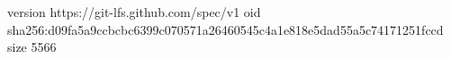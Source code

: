 version https://git-lfs.github.com/spec/v1
oid sha256:d09fa5a9ccbcbc6399c070571a26460545c4a1e818e5dad55a5c74171251fccd
size 5566

